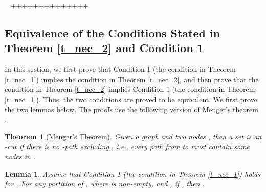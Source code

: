 \documentclass[letterpaper, 11pt]{article}
\newenvironment{proof}{\noindent {\bf Proof:}~}{\hspace*{\fill}}
\newtheorem{theorem}{Theorem}
\newtheorem{lemma}{Lemma}
\begin{document}
\begin{proof}
{++++++++++++++}
\end{proof}








\subsection{Equivalence of the Conditions Stated in Theorem \ref{t_nec_2} and Condition 1}

In this section, we first prove that Condition 1 (the condition in Theorem \ref{t_nec_1}) implies the condition in Theorem \ref{t_nec_2},
and then prove that the condition in Theorem \ref{t_nec_2} implies Condition 1 (the condition in Theorem \ref{t_nec_1}). Thus, the two conditions are proved to be equivalent.
We first prove the two lemmas below. The proofs use the following version of Menger's theorem \cite{Graph_theory_west}.

\begin{theorem}[Menger's Theorem]
Given a graph  and two nodes , then a set  is an -cut if there is no -path excluding , i.e., every path from  to  must contain some nodes in .
\end{theorem}

\begin{lemma}
\label{lemma:prop}
Assume that Condition 1 (the condition in Theorem \ref{t_nec_1}) holds for .
For any partition
 of , where 
is non-empty, and , if ,
then .
\end{lemma}
\end{document}
